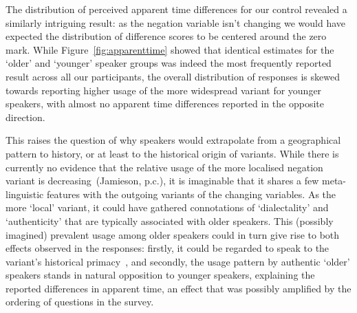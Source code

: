 

The distribution of perceived apparent time differences for our control revealed a similarly intriguing result: as the negation variable isn't changing we would have expected the distribution of difference scores to be centered around the zero mark.
While Figure~\ref{fig:apparenttime} showed that identical estimates for the `older' and `younger' speaker groups was indeed the most frequently reported result across all our participants, the overall distribution of responses is skewed towards reporting higher usage of the more widespread variant for younger speakers, with almost no apparent time differences reported in the opposite direction.



This raises the question of why speakers would extrapolate from a geographical pattern to history, or at least to the historical origin of variants. While there is currently no evidence that the relative usage of the more localised negation variant is decreasing~(Jamieson, p.c.), it is imaginable that it shares a few meta-linguistic features with the outgoing variants of the changing variables. As the more `local' variant, it could have gathered connotations of `dialectality' and `authenticity' that are typically associated with older speakers. %
This (possibly imagined) prevalent usage among older speakers could in turn give rise to both effects observed in the responses: firstly, it could be regarded to speak to the variant's historical primacy~\citep{Bailey2002}, and secondly, the usage pattern by authentic `older' speakers stands in natural opposition to younger speakers, explaining the reported differences in apparent time, an effect that was possibly amplified by the ordering of questions in the survey.

